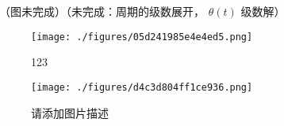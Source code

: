 （图未完成）（未完成：周期的级数展开， $\theta(t)$ 级数解）


\begin{figure}[ht]
\centering
\texttt{[image: ./figures/05d241985e4e4ed5.png]}
\caption{123} \label{fig_SinPen_1}
\end{figure}
\begin{figure}[ht]
\centering
\texttt{[image: ./figures/d4c3d804ff1ce936.png]}
\caption{请添加图片描述} \label{fig_SinPen_2}
\end{figure}
